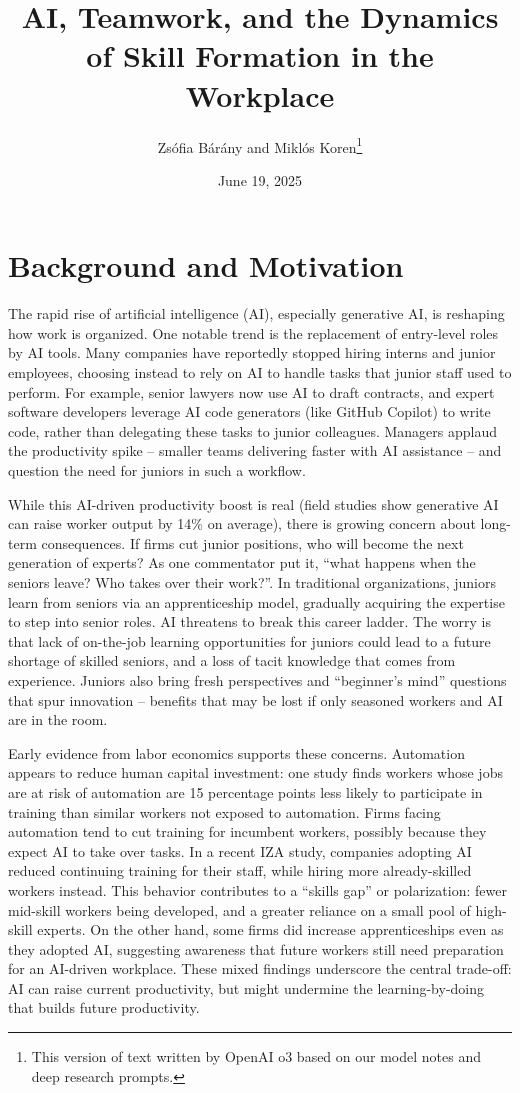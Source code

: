 \documentclass[12pt]{article}
\title{AI, Teamwork, and the Dynamics of Skill Formation in the Workplace}
\author{Zsófia Bárány and Miklós Koren\thanks{This version of text written by OpenAI o3 based on our model notes and deep research prompts.}}
\date{June 19, 2025}
\begin{document}
\maketitle
\section{Background and Motivation}\label{background-and-motivation}

The rapid rise of artificial intelligence (AI), especially generative
AI, is reshaping how work is organized. One notable trend is the
{replacement of entry-level roles by AI tools}. Many companies
have reportedly stopped hiring interns and junior employees, choosing
instead to rely on AI to handle tasks that junior staff used to perform.
For example, {senior lawyers now use AI to draft contracts}, and
{expert software developers leverage AI code generators (like
GitHub Copilot) to write code}, rather than delegating these tasks to
junior colleagues. Managers applaud the productivity spike --
{smaller teams delivering faster with AI assistance} -- and
question the need for juniors in such a workflow.

While this {AI-driven productivity boost} is real (field studies
show generative AI can raise worker output by 14\% on average), there is
growing concern about {long-term consequences}. If firms cut
junior positions, {who will become the next generation of experts?}
As one commentator put it, {``what happens when the seniors leave?
Who takes over their work?''}. In traditional organizations, juniors
learn from seniors via an {apprenticeship model}, gradually
acquiring the expertise to step into senior roles. AI threatens to break
this {career ladder}. The worry is that {lack of
on-the-job learning opportunities} for juniors could lead to a future
shortage of skilled seniors, and a loss of tacit knowledge that comes
from experience. Juniors also bring fresh perspectives and ``beginner's
mind'' questions that spur innovation -- benefits that may be lost if
only seasoned workers and AI are in the room.

Early evidence from labor economics supports these concerns.
{Automation appears to reduce human capital investment:} one
study finds workers whose jobs are at risk of automation are {15
percentage points less likely to participate in training} than similar
workers not exposed to automation. Firms facing automation tend to
{cut training for incumbent workers}, possibly because they
expect AI to take over tasks. In a recent IZA study, companies adopting
AI reduced continuing training for their staff, while hiring more
already-skilled workers instead. This behavior contributes to a
{``skills gap''} or polarization: fewer mid-skill workers being
developed, and a greater reliance on a small pool of high-skill experts.
On the other hand, some firms did increase {apprenticeships} even
as they adopted AI, suggesting awareness that {future workers still
need preparation for an AI-driven workplace}. These mixed findings
underscore the central trade-off: AI can raise current productivity, but
might undermine the {learning-by-doing} that builds future
productivity.
\end{document}
